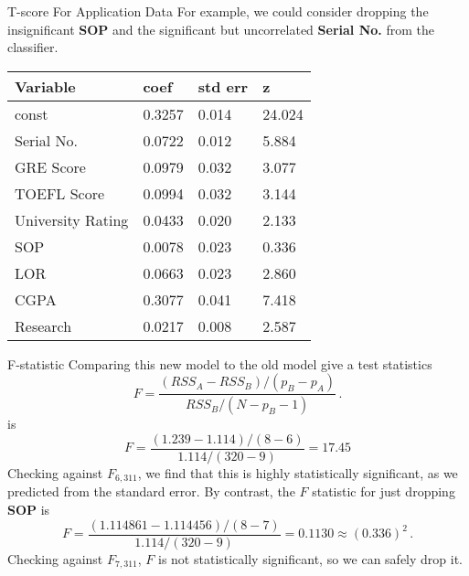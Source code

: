 \documentclass[10pt, table, dvipsnames,xcdraw, handout ]{beamer}
\begin{document}
\begin{frame}[fragile]{T-score For Application Data}
For example, we could consider dropping the insignificant \textbf{SOP} and the significant but uncorrelated \textbf{Serial No.} from the classifier.   
\begin{table}[]
\begin{tabular}{llll}
\hline
\textbf{Variable} & \textbf{coef} & \multicolumn{1}{c}{\textbf{std err}} & \textbf{z} \\ \hline
const             & 0.3257        & 0.014                                & 24.024     \\
Serial No.        & 0.0722        & 0.012                                & 5.884      \\
GRE Score         & 0.0979        & 0.032                                & 3.077      \\
TOEFL Score       & 0.0994        & 0.032                                & 3.144      \\
University Rating & 0.0433        & 0.020                                & 2.133      \\
SOP               & 0.0078        & 0.023                                & 0.336      \\
LOR               & 0.0663        & 0.023                                & 2.860      \\
CGPA              & 0.3077        & 0.041                                & 7.418      \\
Research          & 0.0217        & 0.008                                & 2.587     
\end{tabular}
\end{table}
\end{frame}





\begin{frame}[fragile]{F-statistic}
Comparing this new model to the old model give a test statistics
$$
F = \frac{(RSS_A - RSS_B)/(p_B-p_A)}{RSS_B/(N-p_B-1)}\,.
$$
is
$$
F = \frac{(1.239 - 1.114)/(8-6)}{1.114/(320 - 9)} = 17.45
$$
Checking against $F_{6,311}$, we find that this is highly statistically significant, as we predicted from the standard error. \pause By contrast, the $F$ statistic for just dropping \textbf{SOP} is
$$
F = \frac{(1.114861 - 1.114456)/(8-7)}{1.114/(320 - 9)} = 0.1130 \approx (0.336)^2\,.
$$
Checking against $F_{7,311}$, $F$ is not statistically significant, so we can safely drop it. 
\end{frame}
\end{document}
